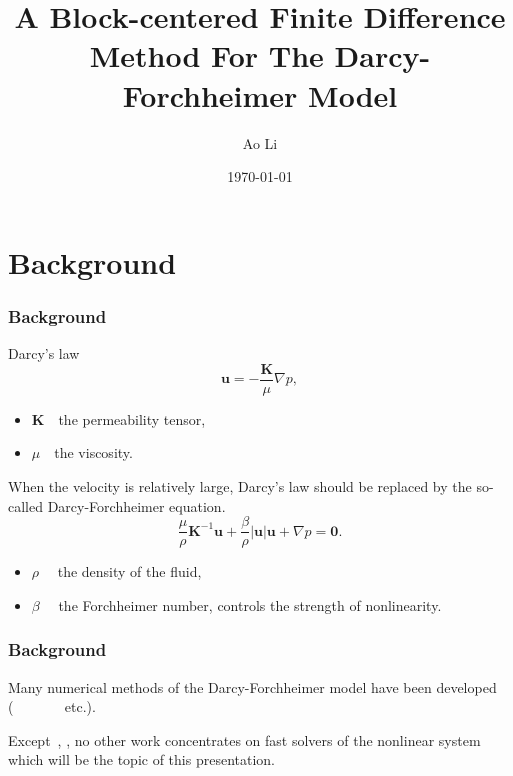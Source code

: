 \documentclass[notheorems,serif]{beamer}
\begin{document}
\title[]{A Block-centered Finite Difference Method For The Darcy-Forchheimer Model}
\author[]{Ao Li\\
}
\date{\today}

\frame[plain]{\titlepage}



\section{Background}
\begin{frame}
\frametitle{Background}
Darcy's law
\[\boldsymbol{u} =  - \frac{\boldsymbol{K}}{\mu }\nabla p,\]

\begin{itemize}
\small
\item $ \boldsymbol{K} $~~the permeability tensor,
\item $\mu $~~the viscosity.
\end{itemize}
When the velocity is relatively large, Darcy's law should be replaced by the so-called Darcy-Forchheimer equation.
\begin{equation*}
\frac{\mu }{\rho }{\boldsymbol{K}^{ - 1}}\boldsymbol{u} + \frac{\beta }{\rho }\left| \boldsymbol{u} \right|\boldsymbol{u} + \nabla p = \boldsymbol{0}.
\end{equation*}
\begin{itemize}
\small
\item $ \rho $ ~~the density of the fluid,
\item $ \beta $ ~~the Forchheimer number, controls the strength of nonlinearity.
\end{itemize}
\end{frame}

\begin{frame}
\frametitle{Background}
Many numerical methods of the Darcy-Forchheimer model have been developed
(~\cite{Park2005}~\cite{Wheeler2008}~\cite{Pan2012}
~\cite{Rui2012}~\cite{RuiLiu2015}~\cite{Wang2015} etc.).

\medskip
Except~\cite{Wheeler2008}, \cite{RuiLiu2015}, no other work concentrates on fast solvers of the nonlinear system which will be the topic of this presentation.

\end{frame}
\end{document}
